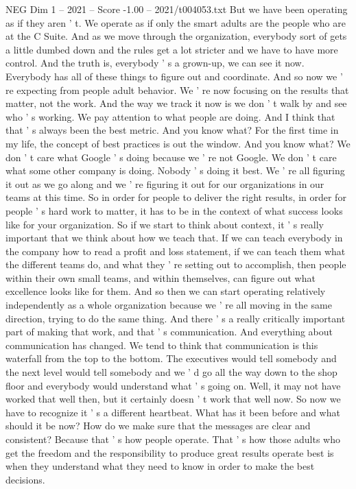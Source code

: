 \begin{textsample}{NEG Dim 1 – 2021 – Score -1.00 – 2021/t004053.txt}
But we have been operating as if they aren ' t.
We operate as if only the smart adults are the people who are at the C Suite.
And as we move through the organization, everybody sort of gets a little dumbed down and the rules get a lot stricter and we have to have more control.
And the truth is, everybody ' s a grown-up, we can see it now.
Everybody has all of these things to figure out and coordinate.
And so now we ' re expecting from people adult behavior.
We ' re now focusing on the results that matter, not the work.
And the way we track it now is we don ' t walk by and see who ' s working.
We pay attention to what people are doing.
And I think that that ' s always been the best metric.
And you know what?
For the first time in my life, the concept of best practices is out the window.
And you know what?
We don ' t care what Google ' s doing because we ' re not Google.
We don ' t care what some other company is doing.
Nobody ' s doing it best.
We ' re all figuring it out as we go along and we ' re figuring it out for our organizations in our teams at this time.
So in order for people to deliver the right results, in order for people ' s hard work to matter, it has to be in the context of what success looks like for your organization.
So if we start to think about context, it ' s really important that we think about how we teach that.
If we can teach everybody in the company how to read a profit and loss statement, if we can teach them what the different teams do, and what they ' re setting out to accomplish, then people within their own small teams, and within themselves, can figure out what excellence looks like for them.
And so then we can start operating relatively independently as a whole organization because we ' re all moving in the same direction, trying to do the same thing.
And there ' s a really critically important part of making that work, and that ' s communication.
And everything about communication has changed.
We tend to think that communication is this waterfall from the top to the bottom.
The executives would tell somebody and the next level would tell somebody and we ' d go all the way down to the shop floor and everybody would understand what ' s going on.
Well, it may not have worked that well then, but it certainly doesn ' t work that well now.
So now we have to recognize it ' s a different heartbeat.
What has it been before and what should it be now?
How do we make sure that the messages are clear and consistent?
Because that ' s how people operate.
That ' s how those adults who get the freedom and the responsibility to produce great results operate best is when they understand what they need to know in order to make the best decisions.

\end{textsample}

